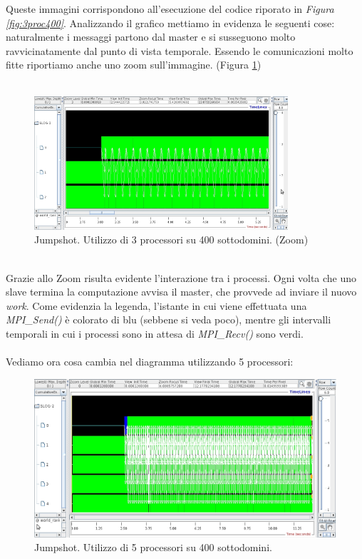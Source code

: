 Queste immagini corrispondono all'esecuzione del codice riporato in \emph{Figura \ref{fig:3proc400}}. Analizzando il grafico mettiamo in evidenza le seguenti cose:
naturalmente i messaggi partono dal master e si susseguono molto ravvicinatamente dal punto di vista temporale. Essendo le comunicazioni molto fitte riportiamo anche uno zoom sull'immagine. (Figura \ref{fig:zoom})
\\
\\
\begin{figure}[htp]
\centering
\includegraphics[width=0.84\textwidth]{Immagini_relazione/8_JS3p400Zoom.jpg}
\caption{Jumpshot. Utilizzo di 3 processori su 400 sottodomini. (Zoom)}
\label{fig:zoom}
\end{figure}
\\
Grazie allo Zoom risulta evidente l'interazione tra i processi. Ogni volta che uno slave termina la computazione avvisa il master, che provvede ad inviare il nuovo \emph{work}. Come evidenzia la legenda, l'istante in cui viene effettuata una \emph{MPI\_Send()} \`e colorato di blu (sebbene si veda poco), mentre gli intervalli temporali in cui i processi sono in attesa di \emph{MPI\_Recv()} sono verdi.  
\\
\\
\newpage
Vediamo ora cosa cambia nel diagramma utilizzando 5 processori:
\\


\begin{figure}[htbp]
\centering
\includegraphics[width=\textwidth]{Immagini_relazione/2_JS5p400.jpg}
\caption{Jumpshot. Utilizzo di 5 processori su 400 sottodomini.}
\label{}
\end{figure}

